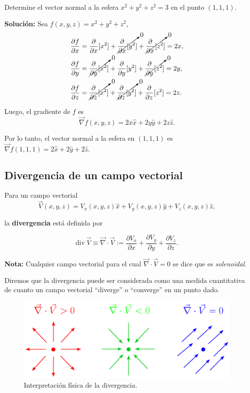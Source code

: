 \begin{ejemplo}
    Determine el vector normal a la esfera $x^2+y^2+z^2 = 3$ en el punto $(1,1,1)$.

    \textbf{Solución:} Sea $f(x,y,z) = x^2+y^2+z^2$, 
    \begin{align*}
        \frac{\partial f}{\partial x} &= \frac{\partial}{\partial x}[x^2] + \cancelto{0}{\frac{\partial}{\partial x}[y^2]} + \cancelto{0}{\frac{\partial}{\partial x}[z^2]} = 2x,   \\
        \frac{\partial f}{\partial y} &=\cancelto{0}{\frac{\partial}{\partial y}[x^2]} + \frac{\partial}{\partial y}[y^2] + \cancelto{0}{\frac{\partial}{\partial y}[z^2]} = 2y, \\
        \frac{\partial f}{\partial z} &=\cancelto{0}{\frac{\partial}{\partial z}[x^2]} + \cancelto{0}{\frac{\partial}{\partial z}[y^2]} + \frac{\partial}{\partial z}[z^2]  = 2z.
    \end{align*}

    Luego, el gradiente de $f$ es
    $$\Vec{\nabla} f(x,y,z) = 2x \hat{x} + 2y \hat{y} + 2z \hat{z}.$$

    Por lo tanto, el vector normal a la esfera en $(1,1,1)$ es $\Vec{\nabla} f(1,1,1) = 2 \hat{x} + 2 \hat{y} + 2 \hat{z}.$
\end{ejemplo}

\subsection*{Divergencia de un campo vectorial}

Para un campo vectorial
$$\vec{V} (x,y,z) = V_x(x,y,z) \hat{x} + V_y(x,y,z) \hat{y} + V_z(x,y,z) \hat{z} ,$$

la \textbf{divergencia} está definida por
\begin{shaded}
    $$\mbox{div} ~\vec{V} \equiv \vec{\nabla} \cdot \vec{V} := \frac{\partial V_x}{\partial x} + \frac{\partial V_y}{\partial y} + \frac{\partial V_z}{\partial z}.$$
\end{shaded}

\textbf{Nota:} Cualquier campo vectorial para el cual $\vec{\nabla} \cdot \vec{V} = 0$ se dice que es \textit{solenoidal}.

Diremos que la divergencia puede ser considerada como una medida cuantitativa de cuanto un campo vectorial “diverge” o “converge” en un punto dado. 

\begin{figure}[H]
    \centering
    \includegraphics[scale = 0.55]{Figuras/Divergencia.pdf}
    \caption{Interpretación física de la divergencia.}
    \label{fig:sign_divergence}
\end{figure}


